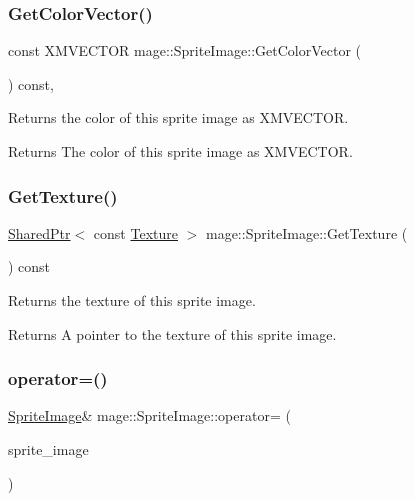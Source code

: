 \subsubsection{\texorpdfstring{Get\+Color\+Vector()}{GetColorVector()}}
{\footnotesize\ttfamily const X\+M\+V\+E\+C\+T\+OR mage\+::\+Sprite\+Image\+::\+Get\+Color\+Vector (\begin{DoxyParamCaption}{ }\end{DoxyParamCaption}) const\hspace{0.3cm}{\ttfamily [private]}, {\ttfamily [noexcept]}}

Returns the color of this sprite image as {\ttfamily X\+M\+V\+E\+C\+T\+OR}.

\begin{DoxyReturn}{Returns}
The color of this sprite image as {\ttfamily X\+M\+V\+E\+C\+T\+OR}. 
\end{DoxyReturn}
\hypertarget{classmage_1_1_sprite_image_a3c88344f40a588d9bd2ecfc922ab9ac4}{}\label{classmage_1_1_sprite_image_a3c88344f40a588d9bd2ecfc922ab9ac4} 
\subsubsection{\texorpdfstring{Get\+Texture()}{GetTexture()}}
{\footnotesize\ttfamily \hyperlink{namespacemage_a1e01ae66713838a7a67d30e44c67703e}{Shared\+Ptr}$<$ const \hyperlink{classmage_1_1_texture}{Texture} $>$ mage\+::\+Sprite\+Image\+::\+Get\+Texture (\begin{DoxyParamCaption}{ }\end{DoxyParamCaption}) const\hspace{0.3cm}{\ttfamily [noexcept]}}

Returns the texture of this sprite image.

\begin{DoxyReturn}{Returns}
A pointer to the texture of this sprite image. 
\end{DoxyReturn}
\hypertarget{classmage_1_1_sprite_image_a20d8e8272cf62599f6c0e4b1ff4f3586}{}\label{classmage_1_1_sprite_image_a20d8e8272cf62599f6c0e4b1ff4f3586} 
\subsubsection{\texorpdfstring{operator=()}{operator=()}\hspace{0.1cm}{\footnotesize\ttfamily [1/2]}}
{\footnotesize\ttfamily \hyperlink{classmage_1_1_sprite_image}{Sprite\+Image}\& mage\+::\+Sprite\+Image\+::operator= (\begin{DoxyParamCaption}\item[{const \hyperlink{classmage_1_1_sprite_image}{Sprite\+Image} \&}]{sprite\+\_\+image }\end{DoxyParamCaption})\hspace{0.3cm}{\ttfamily [delete]}}

